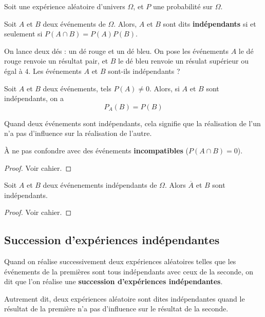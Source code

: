 \documentclass{poly}
\begin{document}
\begin{definition}
Soit une expérience aléatoire d'univers $\Omega$, et $P$ une probabilité sur $\Omega$.

Soit $A$ et $B$ deux événements de $\Omega$. Alors, $A$ et $B$ sont dits \textbf{indépendants} si et seulement si $P(A \cap B) = P(A)P(B)$.
\end{definition}

\begin{example}
On lance deux dés : un dé rouge et un dé bleu. On pose les événements $A$ \og le dé rouge renvoie un résultat pair\fg, et $B$ \og le dé bleu renvoie un résulat supérieur ou égal à $4$\fg. Les événements $A$ et $B$ sont-ils indépendants ?
\vspace*{0.5cm}

\end{example}
\begin{proposition}
Soit $A$ et $B$ deux événements, tels $P(A) \neq 0$. Alors, si $A$ et $B$ sont indépendants, on a
\begin{equation*}
P_A(B) = P(B)
\end{equation*}
\end{proposition}
\begin{remark}
Quand deux événements sont indépendants, cela signifie que la réalisation de l'un n'a pas d'influence sur la réalisation de l'autre.

À ne pas confondre avec des événements \textbf{incompatibles} ($P(A \cap B) = 0$).
\end{remark}
\begin{proof}
Voir cahier.

\end{proof}
\begin{proposition}
Soit $A$ et $B$ deux événenements indépendants de $\Omega$. Alors $\overbar{A}$ et $B$ sont indépendants.
\end{proposition}
\begin{proof}
Voir cahier.
\end{proof}

\subsection{Succession d'expériences indépendantes}
\begin{remark}
Quand on réalise successivement deux expériences aléatoires telles que les événements de la premières sont tous indépendants avec ceux de la seconde, on dit que l'on réalise une \textbf{succession d'expériences indépendantes}. 

Autrement dit, deux expériences aléatoire sont dites indépendantes quand le résultat de la première n'a pas d'influence sur le résultat de la seconde.
\end{remark}
\end{document}
